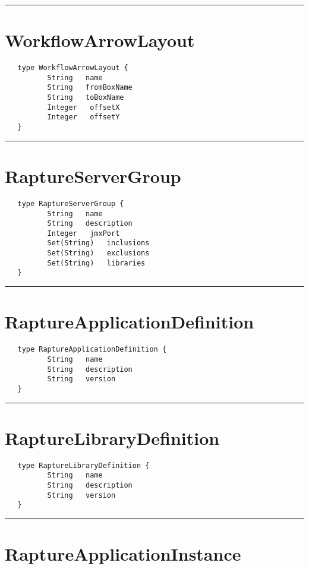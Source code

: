 \rule{15cm}{2pt}
\section{WorkflowArrowLayout}
\label{type:WorkflowArrowLayout}

\begin{verbatim}
   type WorkflowArrowLayout {
          String   name
          String   fromBoxName
          String   toBoxName
          Integer   offsetX
          Integer   offsetY
   }
\end{verbatim}

\rule{15cm}{2pt}
\section{RaptureServerGroup}
\label{type:RaptureServerGroup}

\begin{verbatim}
   type RaptureServerGroup {
          String   name
          String   description
          Integer   jmxPort
          Set(String)   inclusions
          Set(String)   exclusions
          Set(String)   libraries
   }
\end{verbatim}

\rule{15cm}{2pt}
\section{RaptureApplicationDefinition}
\label{type:RaptureApplicationDefinition}

\begin{verbatim}
   type RaptureApplicationDefinition {
          String   name
          String   description
          String   version
   }
\end{verbatim}

\rule{15cm}{2pt}
\section{RaptureLibraryDefinition}
\label{type:RaptureLibraryDefinition}

\begin{verbatim}
   type RaptureLibraryDefinition {
          String   name
          String   description
          String   version
   }
\end{verbatim}

\rule{15cm}{2pt}
\section{RaptureApplicationInstance}
\label{type:RaptureApplicationInstance}

